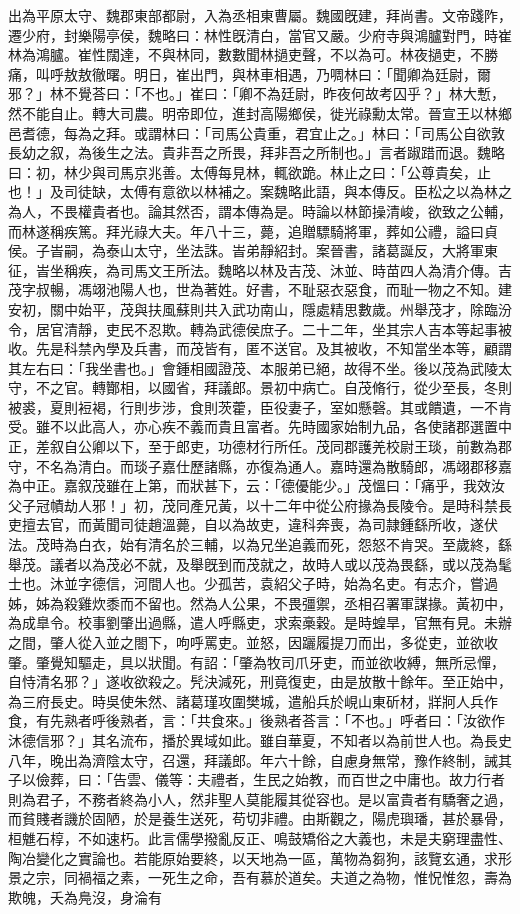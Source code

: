 \begin{pinyinscope}
出為平原太守、魏郡東部都尉，入為丞相東曹屬。魏國旣建，拜尚書。文帝踐阼，遷少府，封樂陽亭侯，魏略曰：林性旣清白，當官又嚴。少府寺與鴻臚對門，時崔林為鴻臚。崔性闊達，不與林同，數數聞林撾吏聲，不以為可。林夜撾吏，不勝痛，叫呼敖敖徹曙。明日，崔出門，與林車相遇，乃啁林曰：「聞卿為廷尉，爾邪？」林不覺荅曰：「不也。」崔曰：「卿不為廷尉，昨夜何故考囚乎？」林大慙，然不能自止。轉大司農。明帝即位，進封高陽鄉侯，徙光祿勳太常。晉宣王以林鄉邑耆德，每為之拜。或謂林曰：「司馬公貴重，君宜止之。」林曰：「司馬公自欲敦長幼之叙，為後生之法。貴非吾之所畏，拜非吾之所制也。」言者踧踖而退。魏略曰：初，林少與司馬京兆善。太傅每見林，輒欲跪。林止之曰：「公尊貴矣，止也！」及司徒缺，太傅有意欲以林補之。案魏略此語，與本傳反。臣松之以為林之為人，不畏權貴者也。論其然否，謂本傳為是。時論以林節操清峻，欲致之公輔，而林遂稱疾篤。拜光祿大夫。年八十三，薨，追贈驃騎將軍，葬如公禮，謚曰貞侯。子峕嗣，為泰山太守，坐法誅。峕弟靜紹封。案晉書，諸葛誕反，大將軍東征，峕坐稱疾，為司馬文王所法。魏略以林及吉茂、沐並、時苗四人為清介傳。吉茂字叔暢，馮翊池陽人也，世為著姓。好書，不耻惡衣惡食，而耻一物之不知。建安初，關中始平，茂與扶風蘇則共入武功南山，隱處精思數歲。州舉茂才，除臨汾令，居官清靜，吏民不忍欺。轉為武德侯庶子。二十二年，坐其宗人吉本等起事被收。先是科禁內學及兵書，而茂皆有，匿不送官。及其被收，不知當坐本等，顧謂其左右曰：「我坐書也。」會鍾相國證茂、本服弟已絕，故得不坐。後以茂為武陵太守，不之官。轉酇相，以國省，拜議郎。景初中病亡。自茂脩行，從少至長，冬則被裘，夏則裋褐，行則步涉，食則茨藿，臣役妻子，室如懸磬。其或饋遺，一不肯受。雖不以此高人，亦心疾不義而貴且富者。先時國家始制九品，各使諸郡選置中正，差叙自公卿以下，至于郎吏，功德材行所任。茂同郡護羌校尉王琰，前數為郡守，不名為清白。而琰子嘉仕歷諸縣，亦復為通人。嘉時還為散騎郎，馮翊郡移嘉為中正。嘉叙茂雖在上第，而狀甚下，云：「德優能少。」茂慍曰：「痛乎，我效汝父子冠幘劫人邪！」初，茂同產兄黃，以十二年中從公府掾為長陵令。是時科禁長吏擅去官，而黃聞司徒趙溫薨，自以為故吏，違科奔喪，為司隷鍾繇所收，遂伏法。茂時為白衣，始有清名於三輔，以為兄坐追義而死，怨怒不肯哭。至歲終，繇舉茂。議者以為茂必不就，及舉旣到而茂就之，故時人或以茂為畏繇，或以茂為髦士也。沐並字德信，河間人也。少孤苦，袁紹父子時，始為名吏。有志介，嘗過姊，姊為殺雞炊黍而不留也。然為人公果，不畏彊禦，丞相召署軍謀掾。黃初中，為成臯令。校事劉肇出過縣，遣人呼縣吏，求索槀穀。是時蝗旱，官無有見。未辦之間，肇人從入並之閤下，呴呼罵吏。並怒，因躧履提刀而出，多從吏，並欲收肇。肇覺知驅走，具以狀聞。有詔：「肇為牧司爪牙吏，而並欲收縛，無所忌憚，自恃清名邪？」遂收欲殺之。髠決減死，刑竟復吏，由是放散十餘年。至正始中，為三府長史。時吳使朱然、諸葛瑾攻圍樊城，遣船兵於峴山東斫材，牂牁人兵作食，有先熟者呼後熟者，言：「共食來。」後熟者荅言：「不也。」呼者曰：「汝欲作沐德信邪？」其名流布，播於異域如此。雖自華夏，不知者以為前世人也。為長史八年，晚出為濟陰太守，召還，拜議郎。年六十餘，自慮身無常，豫作終制，誡其子以儉葬，曰：「告雲、儀等：夫禮者，生民之始教，而百世之中庸也。故力行者則為君子，不務者終為小人，然非聖人莫能履其從容也。是以富貴者有驕奢之過，而貧賤者譏於固陋，於是養生送死，苟切非禮。由斯觀之，陽虎璵璠，甚於暴骨，桓魋石椁，不如速朽。此言儒學撥亂反正、鳴鼓矯俗之大義也，未是夫窮理盡性、陶冶變化之實論也。若能原始要終，以天地為一區，萬物為芻狗，該覽玄通，求形景之宗，同禍福之素，一死生之命，吾有慕於道矣。夫道之為物，惟怳惟忽，壽為欺魄，夭為鳧沒，身淪有
\end{pinyinscope}
